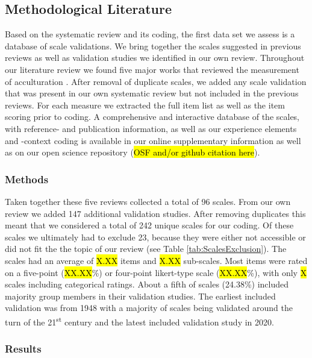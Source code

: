 \subsection{Methodological Literature}

Based on the systematic review and its coding, the first data set we
assess is a database of scale validations. We bring together the scales
suggested in previous reviews as well as validation studies we
identified in our own review. Throughout our literature review we found
five major works that reviewed the measurement of acculturation
\citep{Celenk2011, Maestas2000, Matsudaira2006, Wallace2010, Zane2004}.
After removal of duplicate scales, we added any scale validation that
was present in our own systematic review but not included in the
previous reviews. For each measure we extracted the full item list as
well as the item scoring prior to coding. A comprehensive and
interactive database of the scales, with reference- and publication
information, as well as our experience elements and -context coding is
available in our online supplementary information as well as on our open
science repository (\hl{OSF and/or github citation here}).

\subsubsection{Methods}

Taken together these five reviews collected a total of 96 scales. From
our own review we added 147 additional validation studies. After
removing duplicates this meant that we considered a total of 242 unique
scales for our coding. Of these scales we ultimately had to exclude 23,
because they were either not accessible or did not fit the the topic of
our review (see Table \ref{tab:ScalesExclusion}). The scales had an
average of \hl{X.XX} items and \hl{X.XX} sub-scales. Most items were
rated on a five-point (\hl{XX.XX}\%) or four-point likert-type scale
(\hl{XX.XX}\%), with only \hl{X} scales including categorical ratings.
About a fifth of scales (24.38\%) included majority group members in
their validation studies. The earliest included validation was from 1948
with a majority of scales being validated around the turn of the
21\textsuperscript{st} century and the latest included validation study
in 2020.



\subsubsection{Results}

